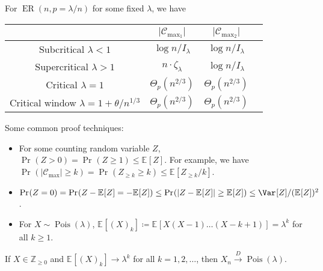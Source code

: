 
\begin{prev}
	For \(\operatorname{ER}(n, p = \lambda / n)\) for some fixed \(\lambda \), we have
	\begin{table}[H]
		\centering
		\begin{tabular}{c|c|c|c}
			\toprule
			                                                     & \(\lvert \mathcal{C} _{\max _1} \rvert \) & \(\lvert \mathcal{C} _{\max _2} \rvert \) & \\
			\midrule
			Subcritical \(\lambda < 1\)                          & \(\log n / I_\lambda \)                   & \(\log n / I_\lambda \)                   & \\
			Supercritical \(\lambda > 1\)                        & \(n \cdot \zeta _\lambda \)               & \(\log n /  I_\lambda \)                  & \\
			Critical \(\lambda = 1\)                             & \(\Theta _p(n^{2 / 3})\)                  & \(\Theta _p(n^{2 / 3})\)                  & \\
			Critical window \(\lambda = 1 + \theta / n^{1 / 3}\) & \(\Theta _p(n^{2 / 3})\)                  & \(\Theta _p(n^{2 / 3})\)                  & \\
			\bottomrule
		\end{tabular}
	\end{table}
	Some common proof techniques:
	\begin{itemize}
		\item For some counting random variable \(Z\), \(\Pr_{}(Z > 0) = \Pr_{}(Z \geq 1) \leq \mathbb{E}_{}[Z] \). For example, we have \(\Pr_{}(\lvert \mathcal{C} _{\max } \rvert \geq k) = \Pr_{}(Z_{\geq k} \geq k) \leq \mathbb{E}_{}[Z_{\geq k} / k] \).
		\item \(\Pr_{}(Z = 0) = \Pr_{}(Z - \mathbb{E}_{}[Z] = - \mathbb{E}_{}[Z] ) \leq \Pr_{}(\lvert Z - \mathbb{E}_{}[Z] \rvert \geq \mathbb{E}_{}[Z] ) \leq \Var_{}[Z] / (\mathbb{E}_{}[Z] )^2\).
		\item For \(X \sim \operatorname{Pois}(\lambda ) \), \(\mathbb{E}_{}[(X)_k] \coloneqq \mathbb{E}_{}[X (X - 1) \dots (X-k+1)] = \lambda ^k\) for all \(k \geq 1\).
	\end{itemize}
\end{prev}

\begin{lemma}
	If \(X \in \mathbb{Z} _{\geq 0}\) and \(\mathbb{E}_{}[(X)_k] \to \lambda ^k\) for all \(k = 1, 2, \dots \), then \(X_n \overset{D}{\to} \operatorname{Pois}(\lambda ) \).
\end{lemma}

